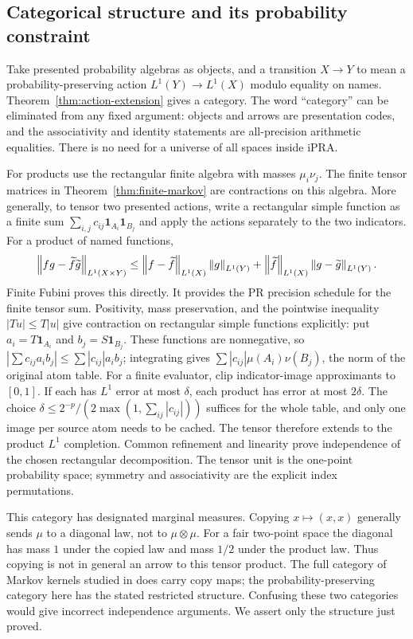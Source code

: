 \subsection{Categorical structure and its probability constraint}

Take presented probability algebras as objects, and a transition $X\to Y$
to mean a probability-preserving action $L^1(Y)\to L^1(X)$ modulo equality
on names. Theorem~\ref{thm:action-extension} gives a category. The word
``category'' can be eliminated from any fixed argument: objects and arrows
are presentation codes, and the associativity and identity statements are
all-precision arithmetic equalities. There is no need for a universe of
all spaces inside iPRA.

For products use the rectangular finite algebra with masses $\mu_i\nu_j$.
The finite tensor matrices in Theorem~\ref{thm:finite-markov} are
contractions on this algebra. More generally, to tensor two presented
actions, write a rectangular simple function as a finite sum
$\sum_{i,j}c_{ij}\mathbf1_{A_i}\mathbf1_{B_j}$ and apply the actions
separately to the two indicators. For a product of named functions,
\[
 \left\lVert fg-\widetilde f\widetilde g\right\rVert_{L^1(X\times Y)}
 \le\left\lVert f-\widetilde f\right\rVert_{L^1(X)}\left\lVert g\right\rVert_{L^1(Y)}
    +\left\lVert\widetilde f\right\rVert_{L^1(X)}\left\lVert g-\widetilde g\right\rVert_{L^1(Y)}.
\]
Finite Fubini proves this directly. It provides the PR precision schedule
for the finite tensor sum. Positivity, mass preservation, and the pointwise
inequality $|Tu|\le T|u|$ give contraction on rectangular simple
functions explicitly: put $a_i=T\mathbf1_{A_i}$ and
$b_j=S\mathbf1_{B_j}$. These functions are nonnegative, so
$|\sum c_{ij}a_ib_j|\le\sum|c_{ij}|a_ib_j$; integrating gives
$\sum|c_{ij}|\mu(A_i)\nu(B_j)$, the norm of the original atom table.
For a finite evaluator, clip indicator-image approximants to $[0,1]$.
If each has $L^1$ error at most $\delta$, each product has error at most
$2\delta$. The choice
$\delta\le2^{-p}/(2\max(1,\sum_{ij}|c_{ij}|))$ suffices for the whole
table, and only one image per source atom needs to be cached.
The tensor therefore extends to the product $L^1$ completion. Common
refinement and linearity prove independence of the chosen rectangular
decomposition. The tensor unit is the one-point probability space;
symmetry and associativity are the explicit index permutations.

This category has designated marginal measures. Copying $x\mapsto(x,x)$
generally sends $\mu$ to a diagonal law, not to $\mu\otimes\mu$.
For a fair two-point space the diagonal has mass $1$ under the copied law
and mass $1/2$ under the product law. Thus copying is not in general an
arrow to this tensor product. The full category of Markov kernels studied
in \cite{fritz} does carry copy maps; the probability-preserving category
here has the stated restricted structure. Confusing these two categories
would give incorrect independence arguments. We assert only the structure
just proved.

